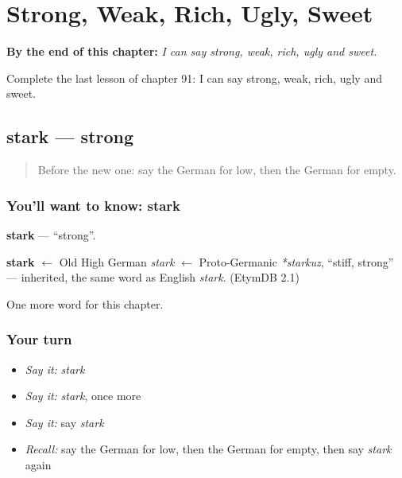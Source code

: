 
\chapter{Strong, Weak, Rich, Ugly, Sweet}
\label{ch:ge-strong-weak-rich-ugly-sweet}

\begin{chapteropening}
\textbf{By the end of this chapter:} \emph{I can say strong, weak, rich, ugly and sweet.}

Complete the last lesson of chapter 91: I can say strong, weak, rich, ugly and sweet.
\end{chapteropening}

\section[stark]{stark — strong}

\label{lesson:GE-C91-stark}



\begin{quote}
Before the new one: say the German for low, then the German for empty.
\end{quote}

\subsection*{You'll want to know: stark}
\textbf{stark} — \textquotedblleft{}strong\textquotedblright{}.

\begin{cousinweb}
\textbf{stark} $\leftarrow$ Old High German \emph{stark} $\leftarrow$ Proto-Germanic \emph{*starkuz}, \textquotedblleft{}stiff, strong\textquotedblright{} — inherited, the same word as English \emph{stark}. (EtymDB 2.1)
\end{cousinweb}

\begin{grammarlens}[title={What you've built}]
One more word for this chapter.
\end{grammarlens}

\subsection*{Your turn}
\begin{itemize}
\raggedright
  \item \emph{Say it:} \emph{stark}
  \item \emph{Say it:} \emph{stark}, once more
  \item \emph{Say it:} say \emph{stark}
  \item \emph{Recall:} say the German for low, then the German for empty, then say \emph{stark} again
\end{itemize}

